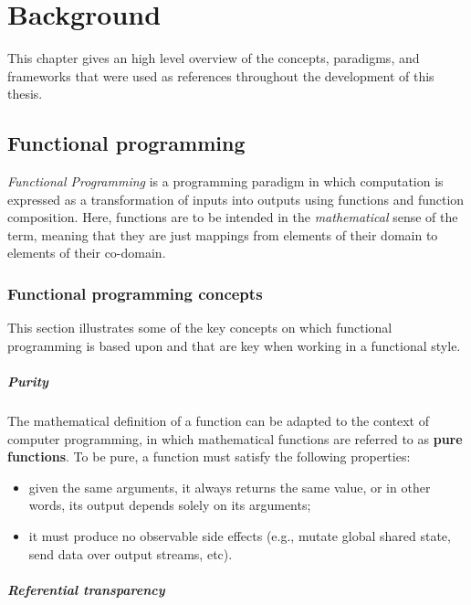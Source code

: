 \chapter{Background}
\label{chap:background}

This chapter gives an high level overview of the concepts, paradigms, and frameworks that were used as references throughout the development of this thesis.

\section{Functional programming}
\label{sec:fp}

\textit{Functional Programming} is a programming paradigm in which computation is expressed as a transformation of inputs into outputs using functions and function composition.
%
Here, functions are to be intended in the \textit{mathematical} sense of the term, meaning that they are just mappings from elements of their domain to elements of their co-domain.

\subsection{Functional programming concepts}

This section illustrates some of the key concepts on which functional programming is based upon and that are key when working in a functional style.

\paragraph{Purity}

The mathematical definition of a function can be adapted to the context of computer programming, in which mathematical functions are referred to as \textbf{pure functions}.
%
To be pure, a function must satisfy the following properties:
%
\begin{itemize}
    \item given the same arguments, it always returns the same value, or in other words, its output depends solely on its arguments;
    \item it must produce no observable side effects (e.g., mutate global shared state, send data over output streams, etc).
\end{itemize}

\paragraph{Referential transparency}

